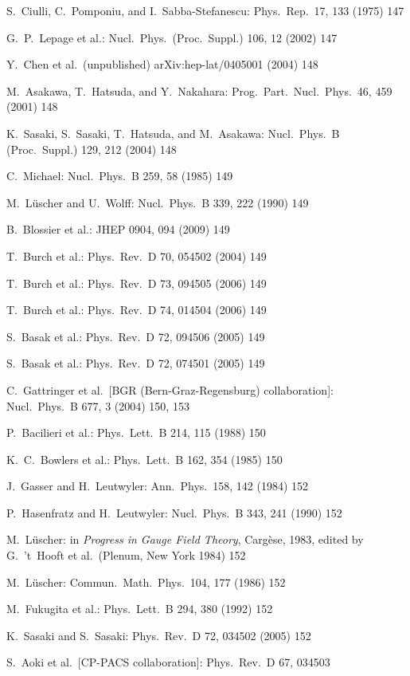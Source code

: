 \begin{enumerate}[label={[\arabic*]}]
  \item S.~Ciulli, C.~Pomponiu, and I.~Sabba-Stefanescu: Phys.\ Rep.\ 17, 133
        (1975) 147
  \item G.~P.~Lepage et al.: Nucl.\ Phys.\ (Proc.\ Suppl.) 106, 12 (2002) 147
  \item Y.~Chen et al.\ (unpublished) arXiv:hep-lat/0405001 (2004) 148
  \item M.~Asakawa, T.~Hatsuda, and Y.~Nakahara: Prog.\ Part.\ Nucl.\ Phys.\ 46,
        459 (2001) 148
  \item K.~Sasaki, S.~Sasaki, T.~Hatsuda, and M.~Asakawa: Nucl.\ Phys.\ B
        (Proc.\ Suppl.) 129, 212 (2004) 148
  \item C.~Michael: Nucl.\ Phys.\ B 259, 58 (1985) 149
  \item M.~L\"uscher and U.~Wolff: Nucl.\ Phys.\ B 339, 222 (1990) 149
  \item B.~Blossier et al.: JHEP 0904, 094 (2009) 149
  \item T.~Burch et al.: Phys.\ Rev.\ D 70, 054502 (2004) 149
  \item T.~Burch et al.: Phys.\ Rev.\ D 73, 094505 (2006) 149
  \item T.~Burch et al.: Phys.\ Rev.\ D 74, 014504 (2006) 149
  \item S.~Basak et al.: Phys.\ Rev.\ D 72, 094506 (2005) 149
  \item S.~Basak et al.: Phys.\ Rev.\ D 72, 074501 (2005) 149
  \item C.~Gattringer et al.\ [BGR (Bern-Graz-Regensburg) collaboration]: Nucl.\
        Phys.\ B 677, 3 (2004) 150, 153
  \item P.~Bacilieri et al.: Phys.\ Lett.\ B 214, 115 (1988) 150
  \item K.~C.~Bowlers et al.: Phys.\ Lett.\ B 162, 354 (1985) 150
  \item J.~Gasser and H.~Leutwyler: Ann.\ Phys.\ 158, 142 (1984) 152
  \item P.~Hasenfratz and H.~Leutwyler: Nucl.\ Phys.\ B 343, 241 (1990) 152
  \item M.~L\"uscher: in \emph{Progress in Gauge Field Theory}, Carg\`ese, 1983,
        edited by G.~'t~Hooft et al.\ (Plenum, New York 1984) 152
  \item M.~L\"uscher: Commun.\ Math.\ Phys.\ 104, 177 (1986) 152
  \item M.~Fukugita et al.: Phys.\ Lett.\ B 294, 380 (1992) 152
  \item K.~Sasaki and S.~Sasaki: Phys.\ Rev.\ D 72, 034502 (2005) 152
  \item S.~Aoki et al.\ [CP-PACS collaboration]: Phys.\ Rev.\ D 67, 034503

\end{enumerate}
